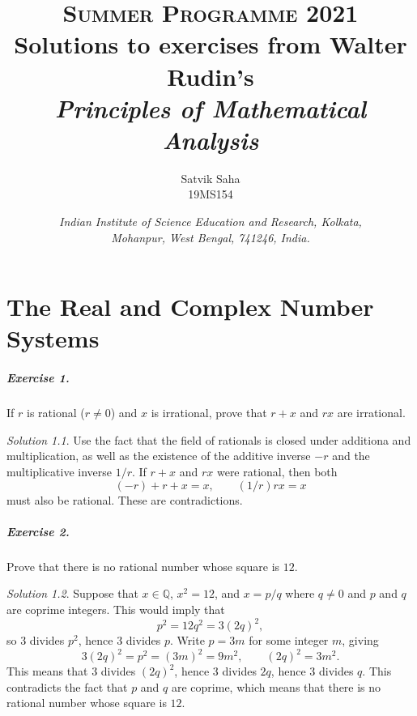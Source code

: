 \documentclass[11pt]{report}
\title{
    \Large\textsc{Summer Programme 2021} \\
    \vspace{10pt}
    \huge Solutions to exercises from Walter Rudin's \\
    \textit{Principles of Mathematical Analysis} 
}
\author{
    \large Satvik Saha%
    \\\textsc{\small 19MS154}
}
\date{\normalsize
    \textit{Indian Institute of Science Education and Research, Kolkata, \\
    Mohanpur, West Bengal, 741246, India.} \\
}
\def\Q{\mathbb{Q}}
\theoremstyle{remark}
\newtheorem*{solution}{Solution}
\begin{document}
    \maketitle

    \chapter{The Real and Complex Number Systems}

    \paragraph{Exercise 1.} If $r$ is rational ($r \neq 0$) and $x$ is irrational,
    prove that $r + x$ and $rx$ are irrational.
    \begin{solution}
        Use the fact that the field of rationals is closed under additiona and
        multiplication, as well as the existence of the additive inverse $-r$ and
        the multiplicative inverse $1 / r$. If $r + x$ and $rx$ were rational, then
        both \[
            (-r) + r + x = x, \qquad (1 / r) rx = x
        \] must also be rational. These are contradictions.
    \end{solution}

    \paragraph{Exercise 2.} Prove that there is no rational number whose square is
    $12$.
    \begin{solution}
        Suppose that $x \in \Q$, $x^2 = 12$, and $x = p / q$ where $q \neq 0$ and
        $p$ and $q$ are coprime integers. This would imply that \[
            p^2 = 12q^2 = 3(2q)^2,
        \] so $3$ divides $p^2$, hence $3$ divides $p$. Write $p = 3m$ for some
        integer $m$, giving \[
            3(2q)^2 = p^2 = (3m)^2 = 9m^2, \qquad (2q)^2 = 3m^2.
        \] This means that $3$ divides $(2q)^2$, hence $3$ divides $2q$, hence $3$
        divides $q$. This contradicts the fact that $p$ and $q$ are coprime, which
        means that there is no rational number whose square is $12$.
    \end{solution}
\end{document}
